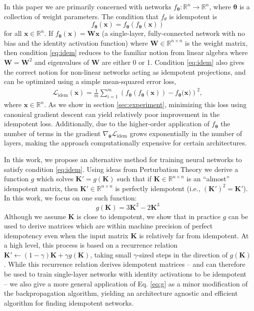 \documentclass{article}
\theoremstyle{plain}
\theoremstyle{definition}
\theoremstyle{remark}
\newcommand{\vx}{\mathbf{x}}
\newcommand{\vK}{\mathbf{K}}
\newcommand{\vW}{\mathbf{W}}
\newcommand{\vtheta}{\bm{\theta}}
\begin{document}
In this paper we are primarily concerned with networks $f_{\vtheta}: \mathbb{R}^n \to \mathbb{R}^n$, where $\vtheta$ is a collection of weight parameters. The condition that $f_{\theta}$ is idempotent is
%
\begin{equation}
    f_{\vtheta}(\vx) = f_{\vtheta}(f_{\vtheta}(\vx))
    \label{eq:idem}
\end{equation}
%
for all $\vx \in \mathbb{R}^n$. If $f_{\vtheta}(\vx) = \vW \vx$ (a single-layer, fully-connected network with no bias and the identity activation function) where $\vW \in \mathbb{R}^{n \times n}$ is the weight matrix, then condition \ref{eq:idem} reduces to the familiar notion from linear algebra where $\vW = \vW^2$ and eigenvalues of $\vW$ are either 0 or 1. Condition \ref{eq:idem} also gives the correct notion for non-linear networks acting as idempotent projections, and can be optimized using a simple mean-squared error loss,
%
\begin{align}
    \mathcal{L}_\text{idem}(\vx) = \frac{1}{m} \sum_{i = 1}^m \left(f_{\vtheta}(f_{\vtheta}(\vx)) - f_{\vtheta}\big(\vx \big)\right)^2,
    \label{eq:idem-loss}
\end{align}
%
where $\vx \in \mathbb{R}^{n}$. As we show in section \ref{sec:experiment}, minimizing this loss using canonical gradient descent can yield relatively poor improvement in the idempotent loss. Additionally, due to the higher-order application of $f_{\vtheta}$ the number of terms in the gradient $\nabla_{\vtheta} \mathcal{L}_{\text{idem}}$ grows exponentially in the number of layers, making the approach computationally expensive for certain architectures.

In this work, we propose an alternative method for training neural networks to satisfy condition \ref{eq:idem}. Using ideas from Perturbation Theory \cite{intro-pertub-theory} we derive a function $g$ which solves $\vK' = g(\vK)$ such that if $\vK \in \mathbb{R}^{n \times n}$ is an ``almost'' idempotent matrix, then $\vK' \in \mathbb{R}^{n \times n}$ is perfectly idempotent (i.e., $(\vK')^2 = \vK'$). In this work, we focus on one such function:
%
\begin{equation}
    g(\vK) = 3 \vK^2 - 2 \vK^3
    \label{eq:g}
\end{equation}
%
Although we assume $\vK$ is close to idempotent, we show that in practice $g$ can be used to derive matrices which are within machine precision of perfect idempotency even when the input matrix $\vK$ is relatively far from idempotent. At a high level, this process is based on a recurrence relation ${\vK' \leftarrow (1 - \gamma)\vK + \gamma g(\vK)}$, taking small $\gamma$-sized steps in the direction of $g(\vK)$. While this recurrence relation derives idempotent matrices -- and can therefore be used to train single-layer networks with identity activations to be idempotent -- we also give a more general application of Eq. \ref{eq:g} as a minor modification of the backpropagation algorithm, yielding an architecture agnostic and efficient algorithm for finding idempotent networks.
\end{document}
